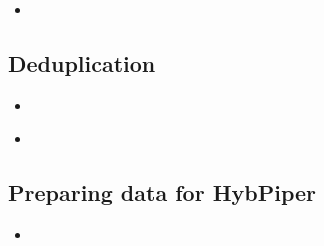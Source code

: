 \documentclass[compress, ucs, xelatex, 11pt, xcolor=x11names, aspectratio=1609,
	hyperref={
		bookmarks=true,
		unicode=true,
		colorlinks=true,
		pdftitle={HybSeq course},
		plainpages=false,
		pdfauthor={Vojtech Zeisek},
		pdfsubject={Practical processing of HybSeq target enrichment sequencing data on computing grids like MetaCentrum},
		pdfcreator={XeLaTeX},
		pdfkeywords={BASH, command line, GNU, HybSeq, Linux, MetaCentrum, sequencing shell, target enrichment},
		linkcolor=Cyan2, %
		anchorcolor=Firebrick2, %
		citecolor=Firebrick2, %
		filecolor=Firebrick2, %
		menucolor=Firebrick2, %
		urlcolor=Chartreuse2, %
		pdftex},
	url={hyphens, lowtilde} %
	]{beamer}
\begin{document}
\begin{frame}[fragile]{}
	\begin{itemize}
		\item 
	\end{itemize}
	\begin{spluscode}
    
	\end{spluscode}
	\begin{bashcode}
    
	\end{bashcode}
\end{frame}

\subsection{Deduplication}

\begin{frame}[fragile]{}
	\begin{itemize}
		\item 
	\end{itemize}
	\begin{spluscode}
    
	\end{spluscode}
	\begin{bashcode}
    
	\end{bashcode}
\end{frame}

\begin{frame}[fragile]{}
	\begin{itemize}
		\item 
	\end{itemize}
	\begin{spluscode}
    
	\end{spluscode}
	\begin{bashcode}
    
	\end{bashcode}
\end{frame}

\subsection{Preparing data for HybPiper}

\begin{frame}[fragile]{}
	\begin{itemize}
		\item 
	\end{itemize}
	\begin{spluscode}
    
	\end{spluscode}
	\begin{bashcode}
    
	\end{bashcode}
\end{frame}
\end{document}
